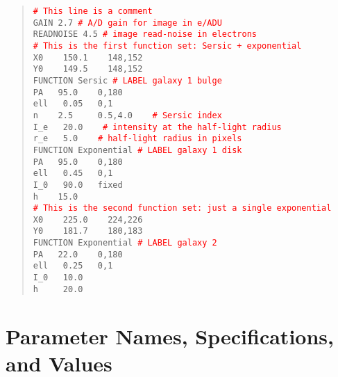 \documentclass[10pt,a4paper,article]{memoir}
\newcommand{\red}{\textcolor{red}}
\begin{document}
\begin{quote}
  \texttt{\red{\# This line is a comment}}\\
  
  \texttt{GAIN  2.7   \red{\# A/D gain for image in e/ADU}}\\
  \texttt{READNOISE  4.5   \red{\# image read-noise in electrons}}\\
  
  \texttt{\red{\# This is the first function set: Sersic + exponential}}\\
  \texttt{X0 ~~   150.1  ~~ 148,152}\\
  \texttt{Y0 ~~   149.5  ~~ 148,152}\\
  \texttt{FUNCTION   Sersic   \red{\# LABEL galaxy 1 bulge}}\\
  \texttt{PA  ~  95.0  ~~ 0,180}\\
  \texttt{ell ~   0.05 ~ 0,1}\\
  \texttt{n   ~~   2.5  ~~~ 0.5,4.0 ~~ \red{\# Sersic index}}\\
  \texttt{I\_e ~  20.0 ~~ \red{\# intensity at the half-light radius}}\\
  \texttt{r\_e ~    5.0 ~~ \red{\# half-light radius in pixels}}\\
  \texttt{FUNCTION   Exponential   \red{\# LABEL galaxy 1 disk}}\\
  \texttt{PA   ~ 95.0  ~~ 0,180}\\
  \texttt{ell  ~  0.45  ~~0,1}\\
  \texttt{I\_0 ~  90.0  ~ fixed}\\
  \texttt{h    ~~ 15.0}\\
  
  \texttt{\red{\# This is the second function set: just a single exponential}}\\
  \texttt{X0 ~~   225.0  ~~ 224,226}\\
  \texttt{Y0 ~~   181.7  ~~ 180,183}\\
  \texttt{FUNCTION   Exponential   \red{\# LABEL galaxy 2}} \\
  \texttt{PA   ~ 22.0  ~~ 0,180      }\\
  \texttt{ell  ~  0.25 ~ 0,1}\\
  \texttt{I\_0 ~  10.0  }\\
  \texttt{h   ~~~  20.0}\\
\end{quote}


\section{Parameter Names, Specifications, and Values}
\end{document}
